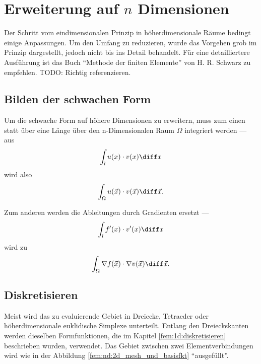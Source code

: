 %
%
%
%
\section{Erweiterung auf $n$ Dimensionen\label{fem:nD}}
Der Schritt vom eindimensionalen Prinzip in höherdimensionale Räume bedingt einige Anpassungen. 
Um den Umfang zu reduzieren, wurde das Vorgehen grob im Prinzip dargestellt, jedoch nicht bis ins Detail behandelt.
Für eine detailliertere Ausführung ist das Buch ``Methode der finiten Elemente'' von H. R. Schwarz zu empfehlen.
TODO: Richtig referenzieren.


\subsection{Bilden der schwachen Form}
Um die schwache Form auf höhere Dimensionen zu erweitern, muss zum einen statt über eine Länge über den n-Dimensionalen Raum $\Omega$ integriert werden --- aus 
\begin{equation}
    \int_{l} u(x) \cdot v(x) \diff x
\end{equation}
wird also
\begin{equation}
    \int_{\Omega} u(\vec{x}) \cdot v(\vec{x}) \diff \vec{x}.
\end{equation}

Zum anderen werden die Ableitungen durch Gradienten ersetzt ---
\begin{equation}
    \int_{l} f'(x) \cdot v'(x) \diff x
\end{equation}
wird zu
\begin{equation}
    \int_{\Omega} \nabla f(\vec{x}) \cdot \nabla v(\vec{x}) \diff \vec{x}.
\end{equation}


\subsection{Diskretisieren}
Meist wird das zu evaluierende Gebiet in Dreiecke, Tetraeder oder höherdimensionale euklidische Simplexe unterteilt. 
Entlang den Dreieckskanten werden dieselben Formfunktionen, die im Kapitel \ref{fem:1d:diskretisieren} beschrieben wurden, verwendet.
Das Gebiet zwischen zwei Elementverbindungen wird wie in der Abbildung \ref{fem:nd:2d_mesh_und_basisfkt} ``ausgefüllt''.



